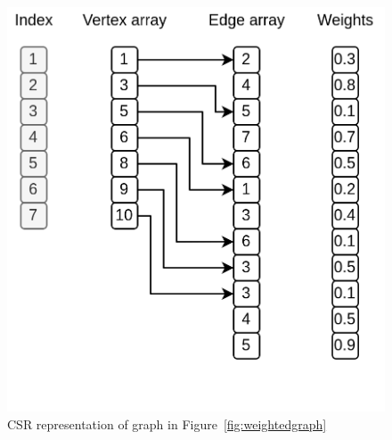 \begin{figure}
  \includegraphics[width=0.6\linewidth]{figures/csr-representation.png}
  \caption{CSR representation of graph in Figure~\ref{fig:weightedgraph}}
  \label{fig:csrweightedgraph}
\end{figure}

    

